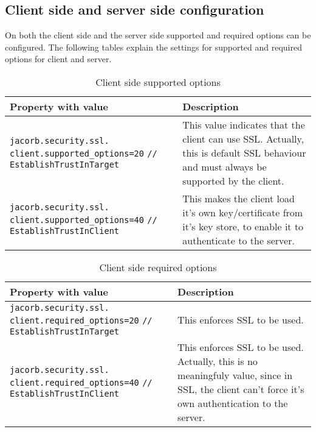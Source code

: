 
\subsection{Client side and server side configuration}
On both the client side and the server side supported and required
options can be configured. The following tables explain the settings
for supported and required options for client and server.

\begin{table}
\caption{Client side supported options}
\begin{tabular}{|p{7cm}|p{7cm}|}
\hline
\textbf{Property with value}& \textbf{Description}\\
\hline
\verb"jacorb.security.ssl."
\verb"client.supported_options=20"
\verb"// EstablishTrustInTarget"& This value indicates that the client can use SSL. Actually, this
is default SSL behaviour and must always be supported by the client.\\
\hline
\verb"jacorb.security.ssl."
\verb"client.supported_options=40"
\verb"// EstablishTrustInClient"& This makes
the client load it's own key/certificate from it's key
store, to enable it to authenticate to the server. \\
\hline
\end{tabular}
\end{table}


\begin{table}
\caption{Client side required options}
\begin{tabular}{|p{7cm}|p{7cm}|}
\hline
\textbf{Property with value}& \textbf{Description}\\
\hline
\verb"jacorb.security.ssl."
\verb"client.required_options=20"
\verb"// EstablishTrustInTarget"& This enforces SSL to be used.\\
\hline
\verb"jacorb.security.ssl."
\verb"client.required_options=40"
\verb"// EstablishTrustInClient"& This
enforces SSL to be used. Actually, this is no meaningfuly
value, since in SSL, the client can't force it's own authentication to
the server. \\
\hline
\end{tabular}
\end{table}

